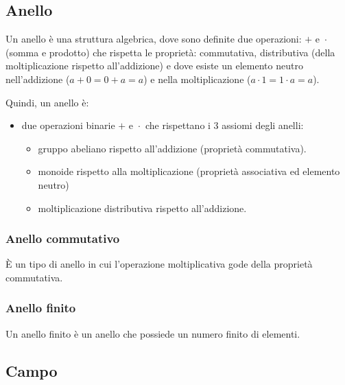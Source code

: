 \subsection{Anello}

   

\textsf{\small Un anello è una struttura algebrica, dove sono definite due operazioni: $+ \text{ e } \cdot$ (somma e prodotto) che rispetta le proprietà: commutativa, distributiva (della moltiplicazione rispetto all'addizione) e dove esiste un elemento neutro nell'addizione ($a + 0 = 0 + a = a$) e nella moltiplicazione ($a \cdot 1 = 1 \cdot a = a$).}

\textsf{\small Quindi, un anello è: }

 

\begin{itemize}
	\item \textsf{\small  due operazioni binarie $+ \text{ e } \cdot$ che rispettano i 3 assiomi degli anelli:}
	\begin{itemize}
		\item \textsf{\small gruppo abeliano rispetto all'addizione (proprietà commutativa).}
		\item \textsf{\small monoide rispetto alla moltiplicazione (proprietà associativa ed elemento neutro)}
		\item \textsf{\small moltiplicazione distributiva rispetto all'addizione.}
	\end{itemize}
\end{itemize}

\subsubsection{Anello commutativo}


\textsf{\small È un tipo di anello in cui l'operazione moltiplicativa gode della proprietà commutativa.}

\subsubsection{Anello finito}

 

\textsf{\small Un anello finito è un anello che possiede un numero finito di elementi.}

\subsection{Campo}

